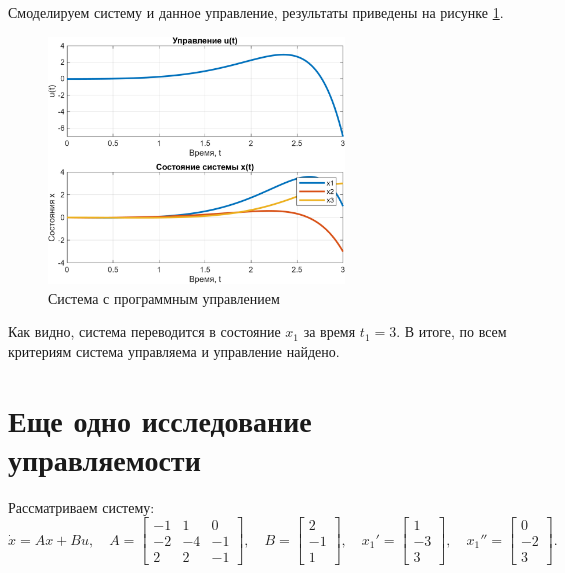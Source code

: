 Смоделируем систему и данное управление, результаты приведены на рисунке \ref{fig:task1}.
\begin{figure}[H]
    \centering
    \includegraphics[width=0.7\textwidth]{figs/task_1.png}
    \caption{Система с программным управлением}
    \label{fig:task1}
\end{figure}
Как видно, система переводится в состояние $x_1$ за время $t_1=3$.
В итоге, по всем критериям система управляема и управление найдено.



\section{Еще одно исследование управляемости}

Рассматриваем систему:
\begin{equation*}
    \dot x=Ax+Bu,\quad
    A=\begin{bmatrix}
        -1 & 1 & 0 \\ -2 & -4 & -1 \\ 2 & 2 & -1
    \end{bmatrix},\quad
    B=\begin{bmatrix}
        2 \\ -1 \\ 1
    \end{bmatrix},\quad
    x_1'=\begin{bmatrix}
        1 \\ -3 \\ 3
    \end{bmatrix},\quad
    x_1''=\begin{bmatrix}
        0\\-2\\3
    \end{bmatrix}.
\end{equation*}

